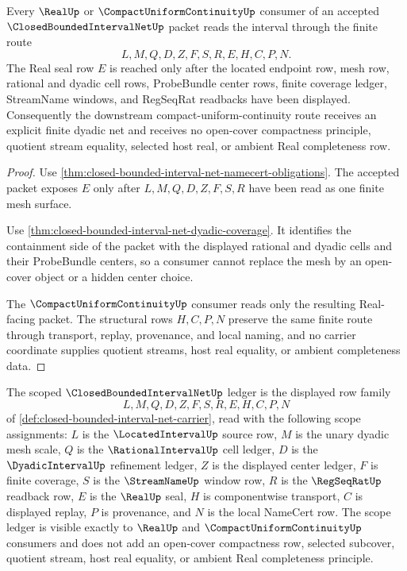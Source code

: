 \begin{theorem}
\label{thm:closed-bounded-interval-net-real-seal-nonescape}
Every $\RealUp$ or $\CompactUniformContinuityUp$ consumer of an accepted $\ClosedBoundedIntervalNetUp$ packet reads the interval through the finite route
$$
L,M,Q,D,Z,F,S,R,E,H,C,P,N.
$$
The Real seal row $E$ is reached only after the located endpoint row, mesh row, rational and dyadic cell rows, ProbeBundle center rows, finite coverage ledger, StreamName windows, and RegSeqRat readbacks have been displayed. Consequently the downstream compact-uniform-continuity route receives an explicit finite dyadic net and receives no open-cover compactness principle, quotient stream equality, selected host real, or ambient Real completeness row.
\end{theorem}
\begin{proof}
Use \autoref{thm:closed-bounded-interval-net-namecert-obligations}. The accepted packet exposes $E$ only after $L,M,Q,D,Z,F,S,R$ have been read as one finite mesh surface.

Use \autoref{thm:closed-bounded-interval-net-dyadic-coverage}. It identifies the containment side of the packet with the displayed rational and dyadic cells and their ProbeBundle centers, so a consumer cannot replace the mesh by an open-cover object or a hidden center choice.

The $\CompactUniformContinuityUp$ consumer reads only the resulting Real-facing packet. The structural rows $H,C,P,N$ preserve the same finite route through transport, replay, provenance, and local naming, and no carrier coordinate supplies quotient streams, host real equality, or ambient completeness data.
\end{proof}

\begin{definition}
\label{def:closed-bounded-interval-net-scope-ledger}
The scoped $\ClosedBoundedIntervalNetUp$ ledger is the displayed row family
$$
L,M,Q,D,Z,F,S,R,E,H,C,P,N
$$
of \autoref{def:closed-bounded-interval-net-carrier}, read with the following scope assignments: $L$ is the $\LocatedIntervalUp$ source row, $M$ is the unary dyadic mesh scale, $Q$ is the $\RationalIntervalUp$ cell ledger, $D$ is the $\DyadicIntervalUp$ refinement ledger, $Z$ is the displayed center ledger, $F$ is finite coverage, $S$ is the $\StreamNameUp$ window row, $R$ is the $\RegSeqRatUp$ readback row, $E$ is the $\RealUp$ seal, $H$ is componentwise transport, $C$ is displayed replay, $P$ is provenance, and $N$ is the local NameCert row. The scope ledger is visible exactly to $\RealUp$ and $\CompactUniformContinuityUp$ consumers and does not add an open-cover compactness row, selected subcover, quotient stream, host real equality, or ambient Real completeness principle.
\end{definition}

